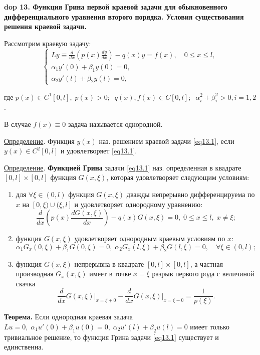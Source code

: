 \textbf{\LARGE dop 13. Функция Грина первой краевой задачи для обыкновенного дифференциального уравнения  второго порядка. Условия существования решения краевой задачи.}
\renewcommand{\theequation}{\arabic{equation}}

Рассмотрим краевую задачу:
\begin{equation} \label{eq13.1}
\begin{cases}
Ly \equiv \frac{d}{dx} \left ( p(x) \frac{dy}{dx} \right ) - q(x) y = f(x), \quad 0 \leq x \leq l, \\
\alpha_1 y'(0) + \beta_1 y(0) = 0, \\
\alpha_2 y'(l) + \beta_2 y(l) = 0,
\end{cases}
\end{equation}

где $p(x) \in C^1[0,l], \; p(x) > 0; \;\; q(x), f(x) \in C[0,l];\; \; \alpha_i^2 + \beta_i^2 > 0, i = 1, 2$.

В случае $f(x) \equiv 0$ задача называется однородной.

\underline{Определение}. Функция $y(x)$ наз. решением краевой задачи \eqref{eq13.1}, если $y(x) \in C^2[0,l]$ и удовлетворяет \eqref{eq13.1}.

\underline{Определение}. \textbf{Функцией Грина} задачи \eqref{eq13.1} наз. определенная в квадрате $[0,l] \times [0,l]$ функция $G(x, \xi)$, которая удовлетворяет следующим условиям:

\begin{enumerate}
    \item для $\forall \xi \in (0,l)$ функция $G(x, \xi)$ дважды непрерывно дифференцируема по $x$ на $[0, \xi) \cup (\xi, l]$ и удовлетворяет однородному уравнению: $$\frac{d}{dx} \left ( p(x) \frac{d G(x, \xi)}{dx} \right ) - q(x) G(x, \xi) = 0, \; 0 \leq x \leq l, \; x \ne \xi;$$
    \item функция $G(x, \xi)$ удовлетворяет однородным краевым условиям по $x$: $$\alpha_1 G_x(0, \xi) + \beta_1 G(0, \xi) = 0, \; \alpha_2 G_x(l, \xi) + \beta_2 G(l, \xi) = 0, \quad \forall \xi \in (0, l);$$
    \item функция $G(x, \xi)$ непрерывна в квадрате $[0, l] \times [0, l]$, а частная производная $G_x(x, \xi)$ имеет в точке $x = \xi$ разрыв первого рода с величиной скачка $$\frac{d}{dx} G(x, \xi) \big |_{x = \xi + 0} - \frac{d}{dx} G(x, \xi) \big |_{x = \xi - 0} = \frac{1}{p(\xi)}.$$
\end{enumerate}

\textbf{Теорема.} Если однородная краевая задача $L u = 0, \; \alpha_1 u'(0) + \beta_1 u(0) = 0, \; \alpha_2 u'(l) + \beta_2 u(l) = 0$ имеет только тривиальное решение, то функция Грина задачи \eqref{eq13.1} существует и единственна.

